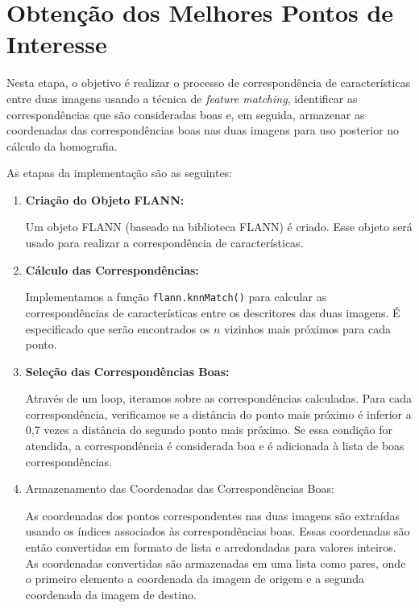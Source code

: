 \documentclass{article}
\begin{document}
\section{Obtenção dos Melhores Pontos de Interesse}

Nesta etapa, o objetivo é realizar o processo de correspondência de características entre duas imagens usando a técnica de \textit{feature matching}, identificar as correspondências que são consideradas boas e, em seguida, armazenar as coordenadas das correspondências boas nas duas imagens para uso posterior no cálculo da homografia. 

As etapas da implementação são as seguintes:

\begin{enumerate}

    \item \textbf{Criação do Objeto FLANN:}

Um objeto FLANN (baseado na biblioteca FLANN) é criado. Esse objeto será usado para realizar a correspondência de características.


    \item \textbf{Cálculo das Correspondências:}

Implementamos a função \texttt{flann.knnMatch()} para calcular as correspondências de características entre os descritores das duas imagens. É especificado que serão encontrados os $n$ vizinhos mais próximos para cada ponto.


    \item \textbf{Seleção das Correspondências Boas:}

Através de um loop, iteramos sobre as correspondências calculadas. Para cada correspondência, verificamos se a distância do ponto mais próximo é inferior a 0,7 vezes a distância do segundo ponto mais próximo. Se essa condição for atendida, a correspondência é considerada boa e é adicionada à lista de boas correspondências.


    \item Armazenamento das Coordenadas das Correspondências Boas:

As coordenadas dos pontos correspondentes nas duas imagens são extraídas usando os índices associados às correspondências boas. Essas coordenadas são então convertidas em formato de lista e arredondadas para valores inteiros.
As coordenadas convertidas são armazenadas em uma lista  como pares, onde o primeiro elemento a coordenada da imagem de origem e a segunda coordenada da imagem de destino.

\end{enumerate}
\end{document}
